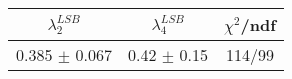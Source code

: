 \begin{tabular}{c|c||c}
$\lambda_{2}^{LSB}$ & $\lambda_4^{LSB}$ & $\chi^{2}$/ndf \\
\hline
0.385 $\pm$ 0.067 & 0.42 $\pm$ 0.15 & 114/99\\
\end{tabular}

